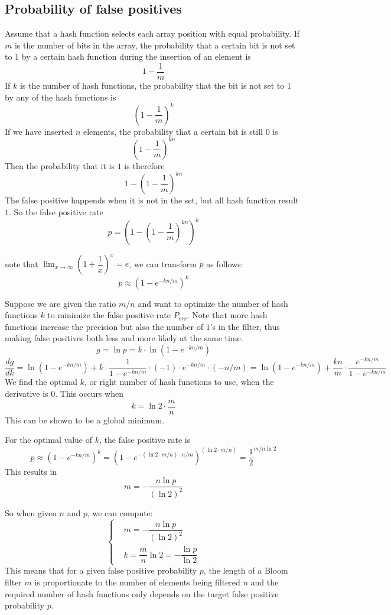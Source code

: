 \subsection{Probability of false positives}
Assume that a hash function selects each array position with equal probability.
If $m$ is the number of bits in the array, the probability that a certain bit is not set to 1 by a certain hash function during the insertion of an element is $$1 - \dfrac{1}{m}$$
If $k$ is the number of hash functions, the probability that the bit is not set to 1 by any of the hash functions is $$(1 - \dfrac{1}{m})^k$$
If we have inserted $n$ elements, the probability that a certain bit is still $0$ is $$(1 - \dfrac{1}{m})^{kn}$$
Then the probability that it is $1$ is therefore $$1 - (1 - \dfrac{1}{m})^{kn}$$
The false positive happends when it is not in the set, but all hash function result $1$. So the false positive rate $$p = (1 - (1 - \dfrac{1}{m})^{kn})^k$$

note that $\lim_{x \to \infty}(1 + \dfrac{1}{x})^x = e$, we can transform $p$ as follows:
$$p \approx (1 - e^{-kn/m})^k$$

Suppose we are given the ratio $m/n$ and want to optimize the number of hash functions $k$ to minimize the false positive rate $P_{err}$.
Note that more hash functions increase the precision but also the number of $1$’s in the filter, thus making false positives both less and more likely at the same time.
$$g = \ln p = k \cdot \ln (1 - e^{-kn/m})$$
$$
\dfrac{dg}{dk}
= \ln (1 - e^{-kn/m}) + k \cdot \dfrac{1}{1 - e^{-kn/m}} \cdot (-1) \cdot e^{-kn/m}\cdot (-n/m)
= \ln (1 - e^{-kn/m}) + \dfrac{kn}{m} \cdot \dfrac{e^{-kn/m}}{1 - e^{-kn/m}}
$$
We find the optimal $k$, or right number of hash functions to use, when the derivative is $0$.
This occurs when $$k = \ln 2 \cdot \dfrac{m}{n}$$
This can be shown to be a global minimum.

For the optimal value of $k$, the false positive rate is
$$
p
\approx (1 - e^{-kn/m})^k
= (1 - e^{- (\ln 2 \cdot m/n) \cdot n/m})^{(\ln 2 \cdot m/n)}
= \dfrac{1}{2}^{m/n \ln 2}
$$
This results in $$m = - \dfrac{n \ln p}{(\ln 2)^2}$$

So when given $n$ and $p$, we can compute:
$$
\left\{
\begin{aligned}
	& m = - \dfrac{n \ln p}{(\ln 2)^2} \\
	& k = \dfrac{m}{n} \ln 2 = - \dfrac{\ln p}{\ln 2}
\end{aligned}
\right.
$$
This means that for a given false positive probability $p$, the length of a Bloom filter $m$ is proportionate to the number of elements being filtered $n$ and
the required number of hash functions only depends on the target false positive probability $p$.

